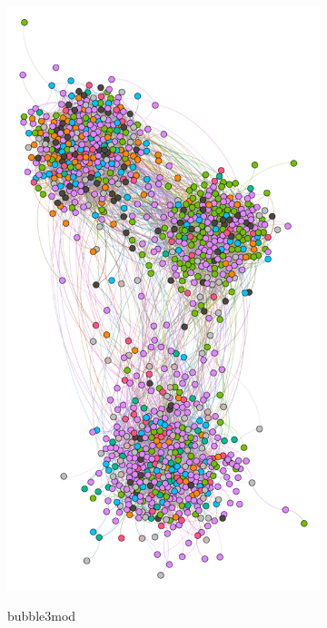 \begin{figure}
\begin{subfigure}[t]{0.25\textwidth}
    \includegraphics[width=\textwidth]{img/dim3_news.pdf}
    \label{fig:bubble3news}
    \caption{bubble3mod}
  \end{subfigure}
  ~
  \begin{subfigure}[t]{0.35\textwidth}

\end{subfigure}
\end{figure}

